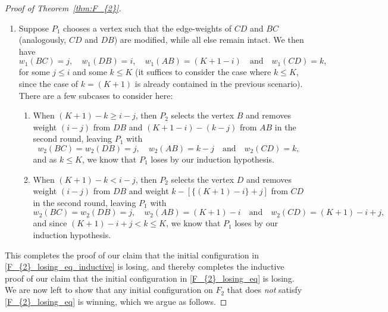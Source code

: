 \documentclass[11pt,reqno]{amsart}
\theoremstyle{definition}
\theoremstyle{definition}
\begin{document}
\begin{proof}[Proof of Theorem~\ref{thm:F_{2}}]
\begin{enumerate}
\item Suppose $P_{1}$ chooses a vertex such that the edge-weights of $CD$ and $BC$ (analogously, $CD$ and $DB$) are modified, while all else remain intact. We then have
\begin{equation}
w_{1}(BC)=j, \quad w_{1}(DB)=i, \quad w_{1}(AB)=(K+1-i) \quad \text{and} \quad w_{1}(CD)=k,\nonumber
\end{equation}
for some $j \leqslant i$ and some $k \leqslant K$ (it suffices to consider the case where $k \leqslant K$, since the case of $k=(K+1)$ is already contained in the previous scenario). There are a few subcases to consider here:
\begin{enumerate}
\item When $(K+1)-k \geqslant i-j$, then $P_{2}$ selects the vertex $B$ and removes weight $(i-j)$ from $DB$ and $(K+1-i)-(k-j)$ from $AB$ in the second round, leaving $P_{1}$ with
\begin{equation}
w_{2}(BC)=w_{2}(DB)=j, \quad w_{2}(AB)=k-j \quad \text{and} \quad w_{2}(CD)=k,\nonumber
\end{equation}
and as $k \leqslant K$, we know that $P_{1}$ loses by our induction hypothesis.

\item When $(K+1)-k < i-j$, then $P_{2}$ selects the vertex $D$ and removes weight $(i-j)$ from $DB$ and weight $k-[\{(K+1)-i\}+j]$ from $CD$ in the second round, leaving $P_{1}$ with
\begin{equation}
w_{2}(BC)=w_{2}(DB)=j, \quad w_{2}(AB)=(K+1)-i \quad \text{and} \quad w_{2}(CD)=(K+1)-i+j,\nonumber
\end{equation}
and since $(K+1)-i+j < k \leqslant K$, we know that $P_{1}$ loses by our induction hypothesis.
\end{enumerate}
\end{enumerate}

This completes the proof of our claim that the initial configuration in \eqref{F_{2}_losing_eq_inductive} is losing, and thereby completes the inductive proof of our claim that the initial configuration in \eqref{F_{2}_losing_eq} is losing. We are now left to show that any initial configuration on $F_{2}$ that does \emph{not} satisfy \eqref{F_{2}_losing_eq} is winning, which we argue as follows.


\end{proof}
\end{document}

